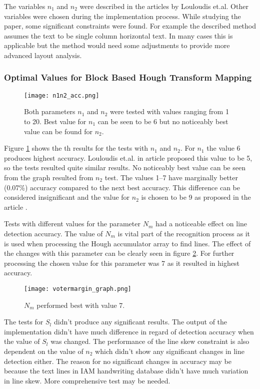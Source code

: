 \documentclass{article}
\begin{document}
    The variables $n_1$ and $n_2$ were described in the articles by Louloudis et.al. Other variables were chosen during the implementation process. While studying the paper, some significant constraints were found. For example the described method assumes the text to be single column horizontal text. In many cases this is applicable but the method would need some adjustments to provide more advanced layout analysis.

    \subsubsection{Optimal Values for Block Based Hough Transform Mapping}
    \begin{figure}[!ht]
      \centering
      \texttt{[image: n1n2\_acc.png]}
      \caption{Both parameters $n_1$ and $n_2$ were tested with values ranging from 1 to 20. Best value for $n_1$ can be seen to be 6 but no noticeably best value can be found for $n_2$.
      \label{fig:n1n2}}
    \end{figure}

    Figure \ref{fig:n1n2} shows the th results for the tests with $n_1$ and $n_2$. For $n_1$ the value 6 produces highest accuracy. Louloudis et.al. in article \cite{Louloudis2} proposed this value to be 5, so the tests resulted quite similar results. No noticeably best value can be seen from the graph resulted from $n_2$ test. The values 1--7 have marginally better (0.07\%) accuracy compared to the next best accuracy. This difference can be considered insignificant and the value for $n_2$ is chosen to be 9 as proposed in the article \cite{Louloudis2}.

    Tests with different values for the parameter $N_m$ had a noticeable effect on line detection accuracy. The value of $N_m$ is vital part of the recognition process as it is used when processing the Hough accumulator array to find lines. The effect of the changes with this parameter can be clearly seen in figure \ref{fig:votermargin}. For further processing the chosen value for this parameter was 7 as it resulted in highest accuracy.

    \begin{figure}[!ht]
      \centering
      \texttt{[image: votermargin\_graph.png]}
      \caption{$N_m$ performed best with value 7.
      \label{fig:votermargin}}
    \end{figure}

    The tests for $S_l$ didn't produce any significant results. The output of the implementation didn't have much difference in regard of detection accuracy when the value of $S_l$ was changed. The performance of the line skew constraint is also dependent on the value of $n_2$ which didn't show any significant changes in line detection either. The reason for no significant changes in accuracy may be because the text lines in IAM handwriting database didn't have much variation in line skew. More comprehensive test may be needed.
\end{document}

